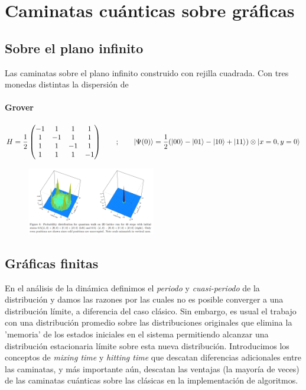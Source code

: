 \chapter{Caminatas cuánticas sobre gráficas}

\section{Sobre el plano infinito}
Las caminatas sobre el plano infinito construido con rejilla cuadrada. Con tres monedas distintas la dispersión de

\subsubsection*{Grover}
\begin{equation}
H=\frac{1}{2}
\begin{pmatrix}
-1 & 1 & 1 & 1\\
1 & -1 & 1 & 1\\
1 & 1 & -1 & 1\\
1 & 1 & 1 & -1
\end{pmatrix}
\qquad ; \qquad    \ket{\Psi(0)}=\frac{1}{2}(\ket{00}-\ket{01}-\ket{10}+\ket{11})\otimes\ket{x=0,y=0}
\end{equation}{}

\begin{figure}[ht]
\caption{}
\centering
\includegraphics[width=0.5\textwidth]{QWGroverCoinKendonPercolation2019.png}
\end{figure}

\section{Gráficas finitas}
En el análisis de la dinámica definimos el \textit{periodo} y \textit{cuasi-periodo} de la distribución y damos las razones por las cuales no es posible converger a una distribución límite, a diferencia del caso clásico\cite{aharonov2001quantum}. Sin embargo, es usual el trabajo con una distribución promedio sobre las distribuciones originales que elimina la 'memoria' de los estados iniciales en el sistema permitiendo alcanzar una distribución estacionaria límite sobre esta nueva distribución. Introducimos los conceptos de \textit{mixing time} y \textit{hitting time} que descatan diferencias adicionales entre las caminatas, y más importante aún, descatan las ventajas (la mayoría de veces) de las caminatas cuánticas sobre las clásicas en la implementación de algoritmos.\\

